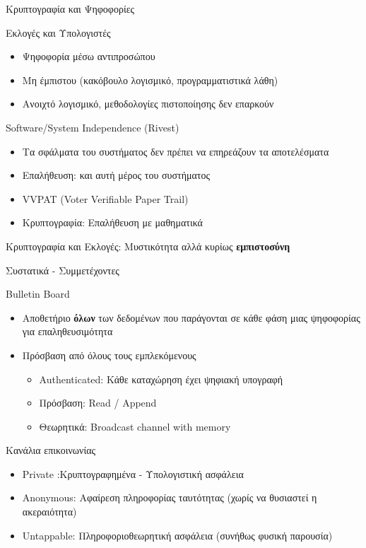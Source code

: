 \documentclass[handout]{beamer}
\begin{document}
\begin{section}{Κρυπτογραφία και Ψηφοφορίες}

\begin{frame}{Εκλογές και Υπολογιστές}
\begin{small}
\begin{itemize}
 \item Ψηφοφορία μέσω αντιπροσώπου \pause
 \item Μη έμπιστου (κακόβουλο λογισμικό, προγραμματιστικά λάθη) \pause
 \item Ανοιχτό λογισμικό, μεθοδολογίες πιστοποίησης δεν επαρκούν \pause
\end{itemize}
\begin{block}{Software/System Independence (Rivest)}
\begin{itemize}
 \item Τα σφάλματα του συστήματος δεν πρέπει να επηρεάζουν τα αποτελέσματα  
 \item Επαλήθευση: και αυτή μέρος του συστήματος \pause
 \item VVPAT (Voter Verifiable Paper Trail) \pause
 \item Κρυπτογραφία: Επαλήθευση με μαθηματικά \pause
\end{itemize}
\end{block} \pause
Κρυπτογραφία και Εκλογές: Μυστικότητα αλλά κυρίως \textbf{εμπιστοσύνη}
\end{small}
\end{frame}


\begin{frame}[allowframebreaks]{Συστατικά - Συμμετέχοντες}
\begin{block}{Bulletin Board}
\begin{itemize}
\item Αποθετήριο \textbf{όλων} των δεδομένων που παράγονται σε κάθε φάση μιας ψηφοφορίας για επαληθευσιμότητα 
\item Πρόσβαση από όλους τους εμπλεκόμενους 
\begin{itemize}
\item Authenticated: Κάθε καταχώρηση έχει ψηφιακή υπογραφή 
\item Πρόσβαση: Read / Append 
\item Θεωρητικά: Broadcast channel with memory
\end{itemize}
\end{itemize}
\end{block}

\framebreak

\begin{block}{Κανάλια επικοινωνίας}
\begin{itemize}
  \item Private :Κρυπτογραφημένα - Υπολογιστική ασφάλεια 
  \item Anonymous: Αφαίρεση πληροφορίας ταυτότητας (χωρίς να θυσιαστεί η ακεραιότητα) 
  \item Untappable: Πληροφοριοθεωρητική ασφάλεια (συνήθως φυσική παρουσία)
\end{itemize}
\end{block}



\end{frame}
\end{section}
\end{document}
